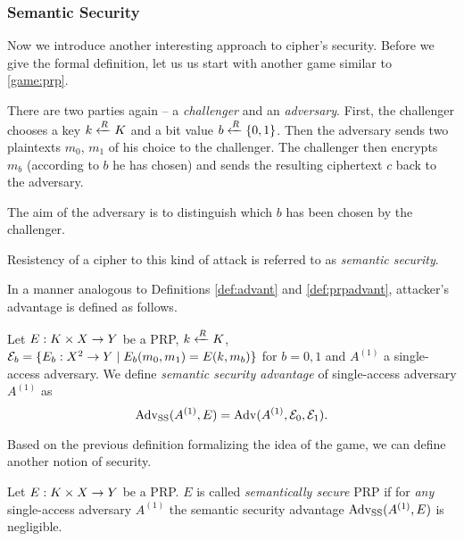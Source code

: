 \subsubsection{Semantic Security}   %

Now we introduce another interesting approach to cipher's security. Before we give the formal definition, let us us start with another game similar to \ref{game:prp}.

\begin{game}
	There are two parties again -- a {\em challenger} and an {\em adversary}. First, the challenger chooses a key $k\xleftarrow{R} K$ and a bit value $b\xleftarrow{R}\{0,1\}$. Then the adversary sends two plaintexts $m_0$, $m_1$ of his choice to the challenger. The challenger then encrypts $m_b$ (according to $b$ he has chosen) and sends the resulting ciphertext $c$ back to the adversary.
	
	The aim of the adversary is to distinguish which $b$ has been chosen by the challenger.
\end{game}


Resistency of a cipher to this kind of attack is referred to as {\em semantic security}.

In a manner analogous to Definitions \ref{def:advant} and \ref{def:prpadvant}, attacker's advantage is defined as follows.

\begin{defn}
\label{def:ssadvant}
	Let $E: K\times X\rightarrow Y$ be a PRP, $k\xleftarrow{R} K$, ${\cal E}_b = \{E_b:X^2\rightarrow Y \mid E_b(m_0,m_1) = E(k,m_b)\}$ for $b=0,1$ and $A^{(1)}$ a single-access adversary. We define {\em semantic security advantage} of single-access adversary $A^{(1)}$ as
	\[
		\operatorname*{Adv_{SS}}(A^{(1)},E) = \operatorname*{Adv}(A^{(1)},{\cal E}_0,{\cal E}_1) .
	\]
\end{defn}

Based on the previous definition formalizing the idea of the game, we can define another notion of security.

\begin{defn}
\label{def:semsecprp}
	Let $E: K\times X\rightarrow Y$ be a PRP. $E$ is called {\em semantically secure} PRP if for {\em any} single-access adversary $A^{(1)}$ the semantic security advantage $\operatorname*{Adv_{SS}}(A^{(1)},E)$ is negligible.
\end{defn}


